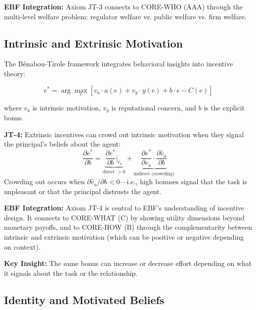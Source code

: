 \textbf{EBF Integration:} Axiom JT-3 connects to CORE-WHO (AAA) through the multi-level welfare problem: regulator welfare vs. public welfare vs. firm welfare.

\subsection{Intrinsic and Extrinsic Motivation}
\label{subsec:jt-motivation}

The Bénabou-Tirole framework \citep{tirole_benabou_2003_intrinsic_motivation, tirole_benabou_2006_incentives_prosocial} integrates behavioral insights into incentive theory:

\begin{equation}
e^* = \arg\max_e \left[ v_a \cdot a(e) + v_y \cdot y(e) + b \cdot e - C(e) \right]
\label{eq:jt-motivation}
\end{equation}

where $v_a$ is intrinsic motivation, $v_y$ is reputational concern, and $b$ is the explicit bonus.

\begin{axiom}
\label{ax:jt-4}
\textbf{JT-4:} Extrinsic incentives can crowd out intrinsic motivation when they signal the principal's beliefs about the agent:
\begin{equation}
\frac{\partial e^*}{\partial b} = \underbrace{\frac{\partial e^*}{\partial b}\bigg|_{v_a}}_{\text{direct } > 0} + \underbrace{\frac{\partial e^*}{\partial v_a} \cdot \frac{\partial \hat{v}_a}{\partial b}}_{\text{indirect (crowding)}}
\end{equation}
Crowding out occurs when $\partial \hat{v}_a / \partial b < 0$---i.e., high bonuses signal that the task is unpleasant or that the principal distrusts the agent.
\end{axiom}

\textbf{EBF Integration:} Axiom JT-4 is central to EBF's understanding of incentive design. It connects to CORE-WHAT (C) by showing utility dimensions beyond monetary payoffs, and to CORE-HOW (B) through the complementarity between intrinsic and extrinsic motivation (which can be positive or negative depending on context).

\textbf{Key Insight:} The same bonus can increase or decrease effort depending on what it signals about the task or the relationship.

\subsection{Identity and Motivated Beliefs}
\label{subsec:jt-identity}

